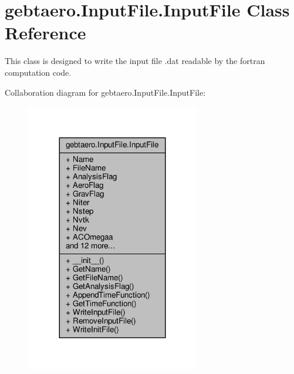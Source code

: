 \hypertarget{classgebtaero_1_1_input_file_1_1_input_file}{}\section{gebtaero.\+Input\+File.\+Input\+File Class Reference}
\label{classgebtaero_1_1_input_file_1_1_input_file}


This class is designed to write the input file .dat readable by the fortran computation code.  




Collaboration diagram for gebtaero.\+Input\+File.\+Input\+File\+:\nopagebreak
\begin{figure}[H]
\begin{center}
\leavevmode
\includegraphics[width=215pt]{classgebtaero_1_1_input_file_1_1_input_file__coll__graph}
\end{center}
\end{figure}
